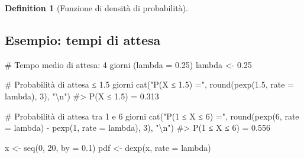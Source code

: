 \documentclass[
  letterpaper,
  DIV=11,
  numbers=noendperiod,
  oneside]{scrreprt}
\newenvironment{Shaded}{\begin{snugshade}}{\end{snugshade}}
\newcommand{\AttributeTok}[1]{\textcolor[rgb]{0.40,0.45,0.13}{#1}}
\newcommand{\CommentTok}[1]{\textcolor[rgb]{0.37,0.37,0.37}{#1}}
\newcommand{\DecValTok}[1]{\textcolor[rgb]{0.68,0.00,0.00}{#1}}
\newcommand{\FloatTok}[1]{\textcolor[rgb]{0.68,0.00,0.00}{#1}}
\newcommand{\FunctionTok}[1]{\textcolor[rgb]{0.28,0.35,0.67}{#1}}
\newcommand{\NormalTok}[1]{\textcolor[rgb]{0.00,0.23,0.31}{#1}}
\newcommand{\OtherTok}[1]{\textcolor[rgb]{0.00,0.23,0.31}{#1}}
\newcommand{\SpecialCharTok}[1]{\textcolor[rgb]{0.37,0.37,0.37}{#1}}
\newcommand{\StringTok}[1]{\textcolor[rgb]{0.13,0.47,0.30}{#1}}
\theoremstyle{definition}
\theoremstyle{plain}
\theoremstyle{definition}
\newtheorem{definition}{Definition}[chapter]
\theoremstyle{remark}
\begin{document}
\begin{definition}[Funzione di densità di
probabilità]
\subsection{Esempio: tempi di attesa}\label{esempio-tempi-di-attesa}

\begin{Shaded}
\begin{Highlighting}[]
\CommentTok{\# Tempo medio di attesa: 4 giorni (lambda = 0.25)}
\NormalTok{lambda }\OtherTok{\textless{}{-}} \FloatTok{0.25}

\CommentTok{\# Probabilità di attesa ≤ 1.5 giorni}
\FunctionTok{cat}\NormalTok{(}\StringTok{"P(X ≤ 1.5) ="}\NormalTok{, }\FunctionTok{round}\NormalTok{(}\FunctionTok{pexp}\NormalTok{(}\FloatTok{1.5}\NormalTok{, }\AttributeTok{rate =}\NormalTok{ lambda), }\DecValTok{3}\NormalTok{), }\StringTok{"}\SpecialCharTok{\textbackslash{}n}\StringTok{"}\NormalTok{)}
\CommentTok{\#\textgreater{} P(X ≤ 1.5) = 0.313}

\CommentTok{\# Probabilità di attesa tra 1 e 6 giorni}
\FunctionTok{cat}\NormalTok{(}\StringTok{"P(1 ≤ X ≤ 6) ="}\NormalTok{, }\FunctionTok{round}\NormalTok{(}\FunctionTok{pexp}\NormalTok{(}\DecValTok{6}\NormalTok{, }\AttributeTok{rate =}\NormalTok{ lambda) }\SpecialCharTok{{-}} \FunctionTok{pexp}\NormalTok{(}\DecValTok{1}\NormalTok{, }\AttributeTok{rate =}\NormalTok{ lambda), }\DecValTok{3}\NormalTok{), }\StringTok{"}\SpecialCharTok{\textbackslash{}n}\StringTok{"}\NormalTok{)}
\CommentTok{\#\textgreater{} P(1 ≤ X ≤ 6) = 0.556}
\end{Highlighting}
\end{Shaded}

\begin{Shaded}
\begin{Highlighting}[]
\NormalTok{x }\OtherTok{\textless{}{-}} \FunctionTok{seq}\NormalTok{(}\DecValTok{0}\NormalTok{, }\DecValTok{20}\NormalTok{, }\AttributeTok{by =} \FloatTok{0.1}\NormalTok{)}
\NormalTok{pdf }\OtherTok{\textless{}{-}} \FunctionTok{dexp}\NormalTok{(x, }\AttributeTok{rate =}\NormalTok{ lambda)}


\end{Highlighting}
\end{Shaded}
\end{definition}
\end{document}
